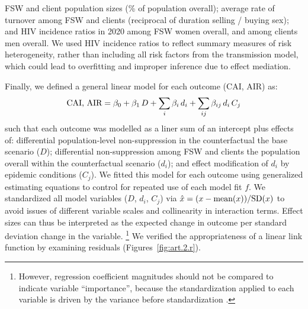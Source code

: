 FSW and client population sizes (\% of population overall);
average rate of turnover among FSW and clients (reciprocal of duration selling / buying sex); and
HIV incidence ratios in 2020 among FSW \vs women overall, and among clients \vs men overall.
We used HIV incidence ratios to reflect summary measures of risk heterogeneity,
rather than including all risk factors from the transmission model,
which could lead to overfitting and improper inference due to effect mediation.
\par
Finally, we defined a general linear model for each outcome (CAI, AIR) as:
\begin{equation}\label{eq:art.2.glm}
  \textnormal{CAI, AIR} = \beta_0
                 + \beta_1\,D
                 + \sum_i \beta_i\,d_i
                 + \sum_{ij} \beta_{ij}\,d_i\,C_j
\end{equation}
such that each outcome was modelled as a liner sum of an intercept plus effects of:
differential population-level non-suppression in the counterfactual \vs the base scenario ($D$);
differential non-suppression among FSW and clients
\vs the population overall within the counterfactual scenario ($d_i$); and
effect modification of $d_i$ by epidemic conditions ($C_j$).
We fitted this model for each outcome using generalized estimating equations \cite{Hojsgaard2006}
to control for repeated use of each model fit $f$.
We standardized all model variables ($D$, $d_i$, $C_j$) via
$\hat{x} = (x - \textnormal{mean}(x)) / \textnormal{SD}(x)$
to avoid issues of different variable scales and collinearity in interaction terms.
Effect sizes can thus be interpreted as
the expected change in outcome per standard deviation change in the variable.%
\footnote{However, regression coefficient magnitudes
  should not be compared to indicate variable ``importance'',
  because the standardization applied to each variable
  is driven by the variance before standardization \cite{Rajerison2012}.}
We verified the appropriateness of a linear link function by examining residuals
(Figures~\ref{fig:art.2.r}).
